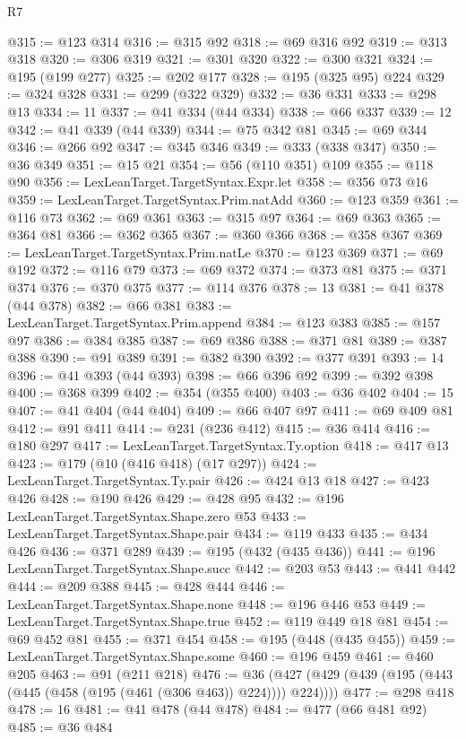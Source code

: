 \begin{lexlean}{R7}
\begin{coremodule}
@315 := @123 @314
@316 := @315 @92
@318 := @69 @316 @92
@319 := @313 @318
@320 := @306 @319
@321 := @301 @320
@322 := @300 @321
@324 := @195 (@199 @277)
@325 := @202 @177
@328 := @195 (@325 @95) @224
@329 := @324 @328
@331 := @299 (@322 @329)
@332 := @36 @331
@333 := @298 @13
@334 := 11
@337 := @41 @334 (@44 @334)
@338 := @66 @337
@339 := 12
@342 := @41 @339 (@44 @339)
@344 := @75 @342 @81
@345 := @69 @344
@346 := @266 @92
@347 := @345 @346
@349 := @333 (@338 @347)
@350 := @36 @349
@351 := @15 @21
@354 := @56 (@110 @351) @109
@355 := @118 @90
@356 := LexLeanTarget.TargetSyntax.Expr.let
@358 := @356 @73 @16
@359 := LexLeanTarget.TargetSyntax.Prim.natAdd
@360 := @123 @359
@361 := @116 @73
@362 := @69 @361
@363 := @315 @97
@364 := @69 @363
@365 := @364 @81
@366 := @362 @365
@367 := @360 @366
@368 := @358 @367
@369 := LexLeanTarget.TargetSyntax.Prim.natLe
@370 := @123 @369
@371 := @69 @192
@372 := @116 @79
@373 := @69 @372
@374 := @373 @81
@375 := @371 @374
@376 := @370 @375
@377 := @114 @376
@378 := 13
@381 := @41 @378 (@44 @378)
@382 := @66 @381
@383 := LexLeanTarget.TargetSyntax.Prim.append
@384 := @123 @383
@385 := @157 @97
@386 := @384 @385
@387 := @69 @386
@388 := @371 @81
@389 := @387 @388
@390 := @91 @389
@391 := @382 @390
@392 := @377 @391
@393 := 14
@396 := @41 @393 (@44 @393)
@398 := @66 @396 @92
@399 := @392 @398
@400 := @368 @399
@402 := @354 (@355 @400)
@403 := @36 @402
@404 := 15
@407 := @41 @404 (@44 @404)
@409 := @66 @407 @97
@411 := @69 @409 @81
@412 := @91 @411
@414 := @231 (@236 @412)
@415 := @36 @414
@416 := @180 @297
@417 := LexLeanTarget.TargetSyntax.Ty.option
@418 := @417 @13
@423 := @179 (@10 (@416 @418) (@17 @297))
@424 := LexLeanTarget.TargetSyntax.Ty.pair
@426 := @424 @13 @18
@427 := @423 @426
@428 := @190 @426
@429 := @428 @95
@432 := @196 LexLeanTarget.TargetSyntax.Shape.zero @53
@433 := LexLeanTarget.TargetSyntax.Shape.pair
@434 := @119 @433
@435 := @434 @426
@436 := @371 @289
@439 := @195 (@432 (@435 @436))
@441 := @196 LexLeanTarget.TargetSyntax.Shape.succ
@442 := @203 @53
@443 := @441 @442
@444 := @209 @388
@445 := @428 @444
@446 := LexLeanTarget.TargetSyntax.Shape.none
@448 := @196 @446 @53
@449 := LexLeanTarget.TargetSyntax.Shape.true
@452 := @119 @449 @18 @81
@454 := @69 @452 @81
@455 := @371 @454
@458 := @195 (@448 (@435 @455))
@459 := LexLeanTarget.TargetSyntax.Shape.some
@460 := @196 @459
@461 := @460 @205
@463 := @91 (@211 @218)
@476 := @36 (@427 (@429 (@439 (@195 (@443 (@445 (@458 (@195 (@461 (@306 @463)) @224)))) @224))))
@477 := @298 @418
@478 := 16
@481 := @41 @478 (@44 @478)
@484 := @477 (@66 @481 @92)
@485 := @36 @484

\end{coremodule}
\end{lexlean}
